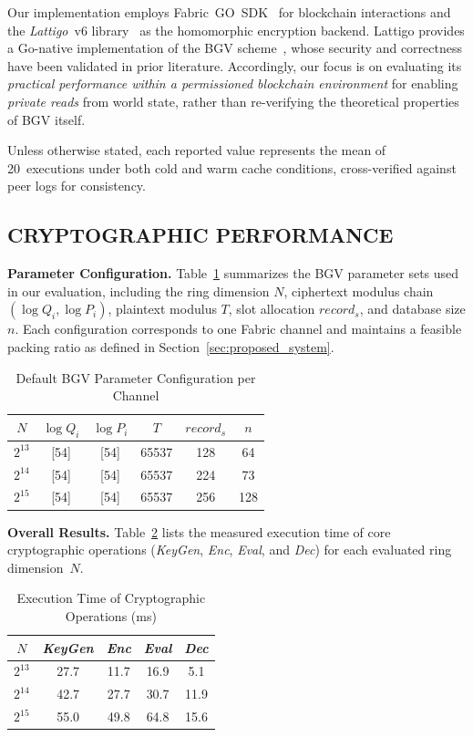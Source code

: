 \documentclass{ieeetj}
\begin{document}
Our implementation employs Fabric~GO~SDK~\cite{fabric_gateway_pkg_client_nodate} for blockchain interactions and
the \emph{Lattigo}~v6 library~\cite{noauthor_lattigo_2024} as the homomorphic encryption backend.
Lattigo provides a Go-native implementation of the BGV scheme~\cite{cryptoeprint:2011/277},
whose security and correctness have been validated in prior literature. 
Accordingly, our focus is on evaluating its \emph{practical performance within a permissioned blockchain environment} for 
enabling \emph{private reads} from world state, rather than re-verifying the theoretical properties of BGV itself.

Unless otherwise stated, each reported value represents the mean of 20~executions under both cold and warm cache conditions, 
cross-verified against peer logs for consistency.

\subsection{CRYPTOGRAPHIC PERFORMANCE}

\noindent\textbf{Parameter Configuration.}
Table~\ref{tab:params} summarizes the BGV parameter sets used in our evaluation, 
including the ring dimension $N$, ciphertext modulus chain $(\log Q_i, \log P_i)$, 
plaintext modulus $T$, slot allocation $record_s$, and database size $n$. 
Each configuration corresponds to one Fabric channel and maintains a feasible 
packing ratio as defined in Section~\ref{sec:proposed_system}.

\begin{table}[!htbp]
\caption{Default BGV Parameter Configuration per Channel}
\label{tab:params}
\centering
\begin{tabular}{|c|c|c|c|c|c|}
\hline
$N$ & $\log Q_i$ & $\log P_i$ & $T$ & $record_s$ & $n$  \\
\hline
$2^{13}$ & [54] & [54] & 65537 & 128 & 64 \\
$2^{14}$ & [54] & [54] & 65537 & 224 & 73 \\
$2^{15}$ & [54] & [54] & 65537 & 256 & 128 \\
\hline
\end{tabular}
\end{table}

\noindent\textbf{Overall Results.}
Table~\ref{tab:crypto-times} lists the measured execution time of core cryptographic operations 
(\emph{KeyGen}, \emph{Enc}, \emph{Eval}, and \emph{Dec}) for each evaluated ring dimension~$N$. 
\begin{table}[!htbp]
  \caption{Execution Time of Cryptographic Operations (ms)}
  \label{tab:crypto-times}
  \centering
  \begin{tabular}{|c|c|c|c|c|}
  \hline
  $N$ & \emph{KeyGen} & \emph{Enc} & \emph{Eval} & \emph{Dec} \\
  \hline
  $2^{13}$ & 27.7 & 11.7 & 16.9 & 5.1 \\
  $2^{14}$ & 42.7 & 27.7 & 30.7 & 11.9 \\
  $2^{15}$ & 55.0 & 49.8 & 64.8 & 15.6 \\
  \hline
  \end{tabular}
\end{table}
\end{document}
